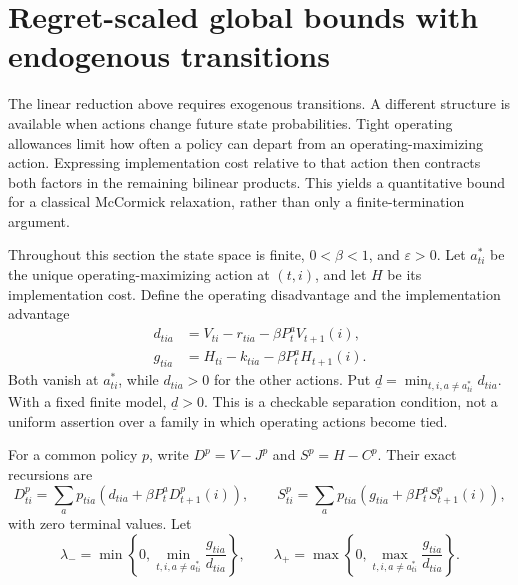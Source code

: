 \section{Regret-scaled global bounds with endogenous transitions}\label{sec:regret-scaled}
The linear reduction above requires exogenous transitions. A different structure is available when actions change future state probabilities. Tight operating allowances limit how often a policy can depart from an operating-maximizing action. Expressing implementation cost relative to that action then contracts both factors in the remaining bilinear products. This yields a quantitative bound for a classical McCormick relaxation, rather than only a finite-termination argument.

Throughout this section the state space is finite, $0<\beta<1$, and $\varepsilon>0$. Let $a^*_{ti}$ be the unique operating-maximizing action at $(t,i)$, and let $H$ be its implementation cost. Define the operating disadvantage and the implementation advantage
\begin{align}
 d_{tia}&=V_{ti}-r_{tia}-\beta P^a_tV_{t+1}(i),\label{eq:regret-gap}\\
 g_{tia}&=H_{ti}-k_{tia}-\beta P^a_tH_{t+1}(i).\label{eq:saving-gap}
\end{align}
Both vanish at $a^*_{ti}$, while $d_{tia}>0$ for the other actions. Put $\underline d=\min_{t,i,a\ne a^*_{ti}}d_{tia}$. With a fixed finite model, $\underline d>0$. This is a checkable separation condition, not a uniform assertion over a family in which operating actions become tied.

For a common policy $p$, write $D^p=V-J^p$ and $S^p=H-C^p$. Their exact recursions are
\begin{equation}\label{eq:regret-saving-recursion}
 D^p_{ti}=\sum_ap_{tia}(d_{tia}+\beta P_t^aD^p_{t+1}(i)),\qquad
 S^p_{ti}=\sum_ap_{tia}(g_{tia}+\beta P_t^aS^p_{t+1}(i)),
\end{equation}
with zero terminal values. Let
\[
 \lambda_- =\min\left\{0,\min_{t,i,a\ne a^*_{ti}}\frac{g_{tia}}{d_{tia}}\right\},\qquad
 \lambda_+ =\max\left\{0,\max_{t,i,a\ne a^*_{ti}}\frac{g_{tia}}{d_{tia}}\right\}.
\]

